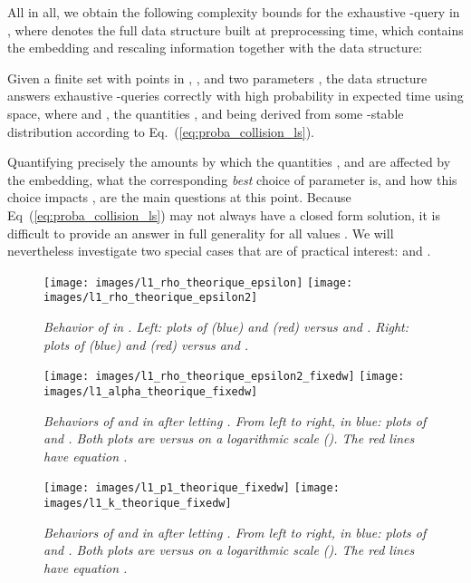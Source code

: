 All in all, we obtain the following complexity bounds for the
exhaustive -\pleb query in , where 
denotes the full data structure built at preprocessing time, which
contains the embedding and rescaling information together with the
 data structure:
\begin{thm} \label{thm:allnn_Rd}
  Given a finite set  with  points in , , and two parameters , the  data
    structure answers exhaustive -\pleb queries correctly with high
    probability in expected  time using  space, where 
    and , the
    quantities ,  and
     being derived from
    some -stable distribution  according to
    Eq.~(\ref{eq:proba_collision_ls}).
\end{thm}
Quantifying precisely the amounts by which the quantities ,
 and  are affected by the
embedding, what the corresponding {\em best} choice of parameter 
is, and how this choice impacts , are the main
questions at this point. Because Eq~(\ref{eq:proba_collision_ls}) may
not always have a closed form solution, it is difficult to provide an
answer in full generality for all values . We will
  nevertheless investigate two special cases that are of practical
  interest:  and .

\begin{figure}[!htb]
\centering
\texttt{[image: images/l1\_rho\_theorique\_epsilon]}
\texttt{[image: images/l1\_rho\_theorique\_epsilon2]}
\caption{\em Behavior of  in . Left: plots
  of  (blue) and 
  (red) versus  and .  Right: plots of  (blue) and
   (red) versus  and .}
\label{fig:l1_rho_theorique}
\end{figure}

\begin{figure}[!htb]
\centering
\texttt{[image: images/l1\_rho\_theorique\_epsilon2\_fixedw]}
\texttt{[image: images/l1\_alpha\_theorique\_fixedw]}
\caption{\em Behaviors of  and  in  after letting . From left to right, in
  blue: plots of  and
  . Both plots are versus
   on a logarithmic scale (). The red lines have
  equation .}
\label{fig:l1_rho_alpha}
\end{figure}

\begin{figure}[!htb]
\centering
\texttt{[image: images/l1\_p1\_theorique\_fixedw]}
\texttt{[image: images/l1\_k\_theorique\_fixedw]}
\caption{\em Behaviors of  and
   in  after
  letting . From left to right, in blue: plots of
   and . Both
  plots are versus  on a logarithmic scale (). The
  red lines have equation .}
\label{fig:l1_p2_k}
\end{figure}

